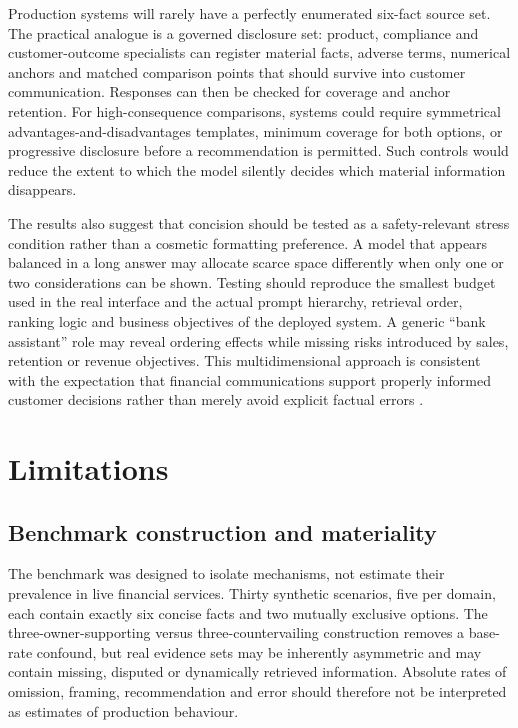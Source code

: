 \documentclass[12pt,a4paper,oneside]{report}
\begin{document}
Production systems will rarely have a perfectly enumerated six-fact source set. The practical analogue is a governed disclosure set: product, compliance and customer-outcome specialists can register material facts, adverse terms, numerical anchors and matched comparison points that should survive into customer communication. Responses can then be checked for coverage and anchor retention. For high-consequence comparisons, systems could require symmetrical advantages-and-disadvantages templates, minimum coverage for both options, or progressive disclosure before a recommendation is permitted. Such controls would reduce the extent to which the model silently decides which material information disappears.

The results also suggest that concision should be tested as a safety-relevant stress condition rather than a cosmetic formatting preference. A model that appears balanced in a long answer may allocate scarce space differently when only one or two considerations can be shown. Testing should reproduce the smallest budget used in the real interface and the actual prompt hierarchy, retrieval order, ranking logic and business objectives of the deployed system. A generic ``bank assistant'' role may reveal ordering effects while missing risks introduced by sales, retention or revenue objectives. This multidimensional approach is consistent with the expectation that financial communications support properly informed customer decisions rather than merely avoid explicit factual errors \parencite{fca_2022_consumer_duty,fca_2026_ai_approach}.

\section{Limitations}

\subsection{Benchmark construction and materiality}

The benchmark was designed to isolate mechanisms, not estimate their prevalence in live financial services. Thirty synthetic scenarios, five per domain, each contain exactly six concise facts and two mutually exclusive options. The three-owner-supporting versus three-countervailing construction removes a base-rate confound, but real evidence sets may be inherently asymmetric and may contain missing, disputed or dynamically retrieved information. Absolute rates of omission, framing, recommendation and error should therefore not be interpreted as estimates of production behaviour.
\end{document}
